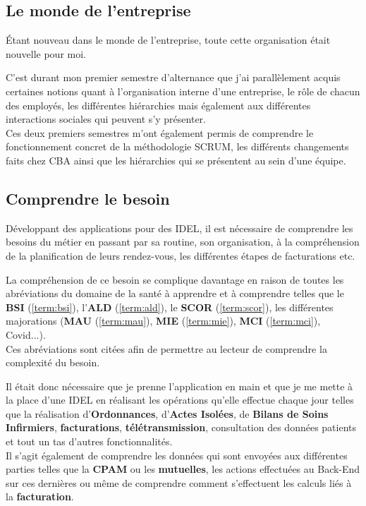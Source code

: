 \documentclass{article}
\begin{document}
\subsection{Le monde de l'entreprise}

Étant nouveau dans le monde de l'entreprise, toute cette organisation était nouvelle pour moi.

C'est durant mon premier semestre d'alternance que j'ai parallèlement acquis certaines notions quant à l'organisation interne d'une entreprise, le rôle de chacun des employés, les différentes hiérarchies mais également aux différentes interactions sociales qui peuvent s'y présenter. \\

Ces deux premiers semestres m'ont également permis de comprendre le fonctionnement concret de la méthodologie SCRUM, les différents changements faits chez CBA ainsi que les hiérarchies qui se présentent au sein d'une équipe.

\subsection{Comprendre le besoin}

Développant des applications pour des IDEL, il est nécessaire de comprendre les besoins du métier en passant par sa routine, son organisation, à la compréhension de la planification de leurs rendez-vous, les différentes étapes de facturations etc.

La compréhension de ce besoin se complique davantage en raison de toutes les abréviations du domaine de la santé à apprendre et à comprendre telles que le \textbf{BSI} (\ref{term:bsi}), l'\textbf{ALD} (\ref{term:ald}), le \textbf{SCOR} (\ref{term:scor}), les différentes majorations (\textbf{MAU} (\ref{term:mau}), \textbf{MIE} (\ref{term:mie}), \textbf{MCI} (\ref{term:mci}), Covid...). \\
Ces abréviations sont citées afin de permettre au lecteur de comprendre la complexité du besoin.

Il était donc nécessaire que je prenne l'application en main et que je me mette à la place d'une IDEL en réalisant les opérations qu'elle effectue chaque jour telles que la réalisation d'\textbf{Ordonnances}, d'\textbf{Actes Isolées}, de \textbf{Bilans de Soins Infirmiers}, \textbf{facturations}, \textbf{télétransmission}, consultation des données patients et tout un tas d'autres fonctionnalités. \\

Il s'agit également de comprendre les données qui sont envoyées aux différentes parties telles que la \textbf{CPAM} ou les \textbf{mutuelles}, les actions effectuées au Back-End sur ces dernières ou même de comprendre comment s'effectuent les calculs liés à la \textbf{facturation}. \\
\end{document}
